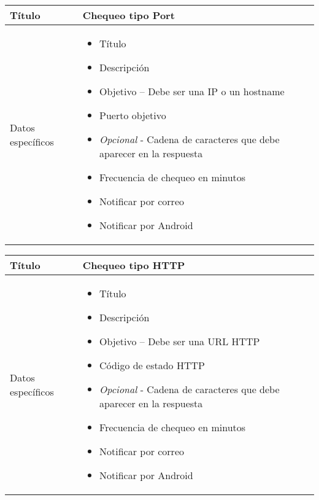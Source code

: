 \begin{center}
  
  \begin{tabularx}{\textwidth}{|l|X|}
    \hline

    Título & Chequeo tipo Port \\

    \hline
    Datos específicos &

    \begin{itemize}
      \item Título 
      \item Descripción
      \item Objetivo -- Debe ser una IP o un hostname
      \item Puerto objetivo
      \item \textit{Opcional} - Cadena de caracteres que debe aparecer en la respuesta
      \item Frecuencia de chequeo en minutos
      \item Notificar por correo
      \item Notificar por Android
    \end{itemize}
    \\
    
    \hline
    
  \end{tabularx}
\end{center}

\begin{center}
  
  \begin{tabularx}{\textwidth}{|l|X|}
    \hline

    Título & Chequeo tipo HTTP \\

    \hline
    Datos específicos &

    \begin{itemize}
      \item Título 
      \item Descripción
      \item Objetivo -- Debe ser una \ac{URL} \ac{HTTP}
      \item Código de estado HTTP
      \item \textit{Opcional} - Cadena de caracteres que debe aparecer en la respuesta
      \item Frecuencia de chequeo en minutos
      \item Notificar por correo
      \item Notificar por Android
    \end{itemize}
    \\
    
    \hline
    
  \end{tabularx}
\end{center}

